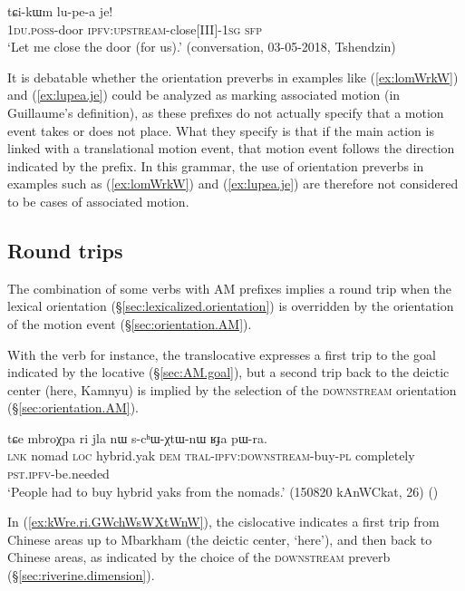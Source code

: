 \begin{exe}
\ex \label{ex:lupea.je}
\gll tɕi-kɯm lu-pe-a je! \\
\textsc{1du}.\textsc{poss}-door \textsc{ipfv}:\textsc{upstream}-close[III]-\textsc{1sg} \textsc{sfp} \\
\glt `Let me close the door (for us).' (conversation, 03-05-2018, Tshendzin)
\end{exe}

It is debatable whether the orientation preverbs in examples like (\ref{ex:lomWrkW}) and (\ref{ex:lupea.je}) could be analyzed as marking associated motion (in Guillaume's \citeyear{guillaume16am} definition), as these prefixes do not actually specify that a motion event takes or does not place. What they specify is that if the main action is linked with a translational motion event, that motion event follows the direction indicated by the prefix. In this grammar, the use of orientation preverbs in examples such as (\ref{ex:lomWrkW}) and (\ref{ex:lupea.je}) are therefore not considered to be cases of associated motion.

\subsection{Round trips} \label{sec:round.trip.AM}
The combination of some verbs with AM prefixes implies a round trip when the lexical orientation (§\ref{sec:lexicalized.orientation}) is overridden by the orientation of the motion event (§\ref{sec:orientation.AM}). 

With the verb  for instance, the translocative expresses a first trip to the goal indicated by the locative  (§\ref{sec:AM.goal}), but a second trip back to the deictic center (here, Kamnyu) is implied by the selection of the \textsc{downstream} orientation (§\ref{sec:orientation.AM}).  

 \begin{exe}
\ex \label{ex:mbroXpa.ri.schWXtWnW}
\gll tɕe mbroχpa ri jla nɯ s-cʰɯ-χtɯ-nɯ ʁɟa pɯ-ra. \\
\textsc{lnk} nomad \textsc{loc} hybrid.yak \textsc{dem}  \textsc{tral}-\textsc{ipfv}:\textsc{downstream}-buy-\textsc{pl} completely \textsc{pst}.\textsc{ipfv}-be.needed \\
\glt `People had to buy hybrid yaks from the nomads.' (150820 kAnWCkat, 26)
()
\end{exe}

In (\ref{ex:kWre.ri.GWchWsWXtWnW}), the cislocative indicates a first trip from Chinese areas up to Mbarkham (the deictic center,  `here'), and then back to Chinese areas, as indicated by the choice of the \textsc{downstream} preverb (§\ref{sec:riverine.dimension}).

